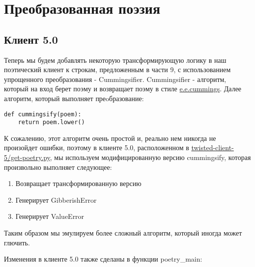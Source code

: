 
\section{Преобразованная поэзия\label{sec:part10}}

\subsection{Клиент 5.0}


Теперь мы будем добавлять некоторую трансформирующую логику в 
наш поэтический клиент к строкам, предложенным в части 9, с 
использованием упрощенного преобразования - Cummingsifier.
Cummingsifier - алгоритм, который на вход берет поэму и возвращает 
поэму в стиле \href{http://en.wikipedia.org/wiki/E.\_E.\_Cummings}{e.e.cummings}.
Далее алгоритм, который выполняет преoбразование:

 \begin{verbatim}
def cummingsify(poem):
    return poem.lower()
\end{verbatim}  

К сожалению, этот алгоритм очень простой и, реально нем никогда не произойдет ошибки, 
поэтому в клиенте 5.0, расположенном в 
\href{http://github.com/jdavisp3/twisted-intro/blob/master/twisted-client-5/get-poetry.py#L1}{twisted-client-5/get-poetry.py}, мы используем модифицированную версию 
cummingsify, которая произвольно выполняет следующее:

\begin{enumerate}
\item Возвращает трансформированную версию
\item Генерирует GibberishError
\item Генерирует ValueError
\end{enumerate}


Таким образом мы эмулируем более сложный алгоритм, который иногда может 
глючить.


Изменения в клиенте 5.0 также сделаны в функции poetry\_main:

